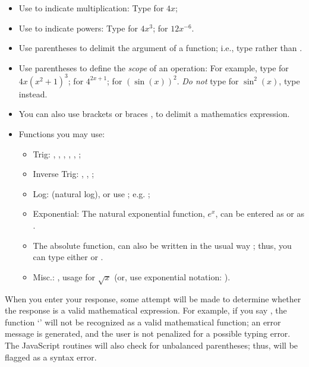 \documentclass{article}
\begin{document}
\begin{itemize}
\item Use \js{*} to indicate multiplication: Type  for $4x$;

\item Use \js{^} to indicate powers: Type  for
$4x^3$;  for $12x^{-6}$.

\item Use parentheses to delimit the argument of a function; i.e., type
 rather than .

\item Use parentheses to define the {\it scope\/} of an operation: For
example, type  for $4x(x^2+1)^3$;  for
$4^{2x+1}$;  for $(\sin(x))^2$. {\it Do not\/} type
 for $\sin^2(x)$, type  instead.

\item You can also use brackets \js{[ ]} or braces \js{\{ \}},
to delimit a mathematics expression.

\item Functions you may use:
\begin{itemize}
    \item  Trig: , , , , , ;
    \item  Inverse Trig: , , ;
    \item  Log:  (natural log), or use ; e.g. ;
    \item  Exponential: The natural exponential function, $e^x$,
           can be entered as  or as .
    \item  The absolute function,  can also be written
           in the usual way \js{|$\cdot$|}; thus, you can type either
            or .
    \item  Misc.: , usage  for $\sqrt{x}$ (or, use
           exponential notation: ).
\end{itemize}
\end{itemize}

When you enter your response, some attempt will be made to
determine whether the response is a valid mathematical expression.
For example, if you say , the function `' will
not be recognized as a valid mathematical function; an error
message is generated, and the user is not penalized for a possible
typing error.  The JavaScript routines will also check for
unbalanced parentheses; thus,  will be
flagged as a syntax error.
\end{document}
